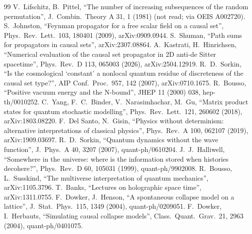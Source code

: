 \documentclass[11pt,a4paper]{article}
\begin{document}
\begin{thebibliography}{99}
 V.~Lifschitz, B.~Pittel, ``The number of increasing subsequences of the random permutation'', J.\ Combin.\ Theory A 31, 1 (1981) (not read; via OEIS A002720).
 S.~Johnston, ``Feynman propagator for a free scalar field on a causal set'', Phys.\ Rev.\ Lett.\ 103, 180401 (2009), arXiv:0909.0944.
 S.~Shuman, ``Path sums for propagators in causal sets'', arXiv:2307.08864.
 A.~Kastrati, H.~Hinrichsen, ``Numerical evaluation of the causal set propagator in 2D anti-de Sitter spacetime'', Phys.\ Rev.\ D 113, 065003 (2026), arXiv:2504.12919.
 R.~D.~Sorkin, ``Is the cosmological `constant' a nonlocal quantum residue of discreteness of the causal set type?'', AIP Conf.\ Proc.\ 957, 142 (2007), arXiv:0710.1675.
 R.~Bousso, ``Positive vacuum energy and the N-bound'', JHEP 11 (2000) 038, hep-th/0010252.
 C.~Yang, F.~C.~Binder, V.~Narasimhachar, M.~Gu, ``Matrix product states for quantum stochastic modelling'', Phys.\ Rev.\ Lett.\ 121, 260602 (2018), arXiv:1803.08220.
 F.~Del Santo, N.~Gisin, ``Physics without determinism: alternative interpretations of classical physics'', Phys.\ Rev.\ A 100, 062107 (2019), arXiv:1909.03697.
 R.~D.~Sorkin, ``Quantum dynamics without the wave function'', J.\ Phys.\ A 40, 3207 (2007), quant-ph/0610204.
 J.~J.~Halliwell, ``Somewhere in the universe: where is the information stored when histories decohere?'', Phys.\ Rev.\ D 60, 105031 (1999), quant-ph/9902008.
 R.~Bousso, L.~Susskind, ``The multiverse interpretation of quantum mechanics'', arXiv:1105.3796.
 T.~Banks, ``Lectures on holographic space time'', arXiv:1311.0755.
 F.~Dowker, J.~Henson, ``A spontaneous collapse model on a lattice'', J.\ Stat.\ Phys.\ 115, 1349 (2004), quant-ph/0209051.
 F.~Dowker, I.~Herbauts, ``Simulating causal collapse models'', Class.\ Quant.\ Grav.\ 21, 2963 (2004), quant-ph/0401075.
\end{thebibliography}
\end{document}
